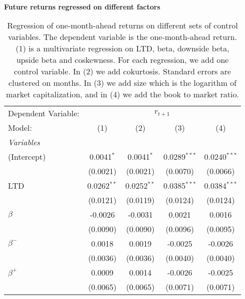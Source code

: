\begin{table}[H]
\caption{\\ \large{\textbf{Future returns regressed on different factors}}}
\captionsetup{justification = justified, width = \linewidth}
\caption*{Regression of one-month-ahead returns on different
                               sets of control variables. The dependent variable is
                               the one-month-ahead return. (1) is a multivariate 
                               regression on LTD, beta, downside beta, upside beta and coskewness. For each regression, we
                               add one control variable. In (2) we add cokurtosis. 
                               Standard errors are clustered on months. In (3) we add size which is the 
                               logarithm of market capitalization, and in (4) we add the book to market ratio.}
   \centering
\label{reg_clustered_on_time_2_size_bm}
   \begin{tabular}{lcccc}
      \tabularnewline \midrule \midrule
      Dependent Variable: & \multicolumn{4}{c}{$r_{t+1}$}\\
      Model:         & (1)           & (2)           & (3)             & (4)\\  
      \midrule
      \emph{Variables}\\
      (Intercept)    & 0.0041$^{*}$  & 0.0041$^{*}$  & 0.0289$^{***}$  & 0.0240$^{***}$\\   
                     & (0.0021)      & (0.0021)      & (0.0070)        & (0.0066)\\   
      LTD            & 0.0262$^{**}$ & 0.0252$^{**}$ & 0.0385$^{***}$  & 0.0384$^{***}$\\   
                     & (0.0121)      & (0.0119)      & (0.0124)        & (0.0124)\\   
      $\beta$        & -0.0026       & -0.0031       & 0.0021          & 0.0016\\   
                     & (0.0090)      & (0.0090)      & (0.0096)        & (0.0095)\\   
      $\beta^{-}$    & 0.0018        & 0.0019        & -0.0025         & -0.0026\\   
                     & (0.0036)      & (0.0036)      & (0.0040)        & (0.0040)\\   
      $\beta^{+}$    & 0.0009        & 0.0014        & -0.0026         & -0.0025\\   
                     & (0.0065)      & (0.0065)      & (0.0071)        & (0.0071)\\   

\end{tabular}
\end{table}
